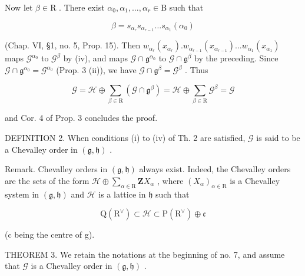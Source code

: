\begin{enumerate}
\end{enumerate}

Now let \(\beta \in \mathrm{R}\) . There exist \(\alpha_0, \alpha_1, \ldots, \alpha_r \in \mathrm{B}\) such that

\[
\beta = s _ {\alpha_ {r}} s _ {\alpha_ {r - 1}} \dots s _ {\alpha_ {1}} (\alpha_ {0})
\]

(Chap. VI, §1, no. 5, Prop. 15). Then \(w_{\alpha_r}(x_{\alpha_r}).w_{\alpha_{r-1}}(x_{\alpha_{r-1}}) \ldots w_{\alpha_1}(x_{\alpha_1})\) maps \(\mathcal{G}^{\alpha_0}\) to \(\mathcal{G}^\beta\) by (iv), and maps \(\mathcal{G} \cap \mathfrak{g}^{\alpha_0}\) to \(\mathcal{G} \cap \mathfrak{g}^\beta\) by the preceding. Since \(\mathcal{G} \cap \mathfrak{g}^{\alpha_0} = \mathcal{G}^{\alpha_0}\) (Prop. 3 (ii)), we have \(\mathcal{G} \cap \mathfrak{g}^\beta = \mathcal{G}^\beta\) . Thus

\[
\mathcal {G} = \mathcal {H} \oplus \sum_ {\beta \in \mathrm{R}} (\mathcal {G} \cap \mathfrak {g} ^ {\beta}) = \mathcal {H} \oplus \sum_ {\beta \in \mathrm{R}} \mathcal {G} ^ {\beta} = \mathcal {G}
\]

and Cor. 4 of Prop. 3 concludes the proof.

DEFINITION 2. When conditions (i) to (iv) of Th. 2 are satisfied, \(\mathcal{G}\) is said to be a Chevalley order in \((\mathfrak{g}, \mathfrak{h})\) .

Remark. Chevalley orders in \((\mathfrak{g},\mathfrak{h})\) always exist. Indeed, the Chevalley orders are the sets of the form \(\mathcal{H}\oplus\sum_{\alpha\in \mathrm{R}}\mathbf{Z}X_{\alpha}\) , where \((X_{\alpha})_{\alpha\in \mathrm{R}}\) is a Chevalley system in \((\mathfrak{g},\mathfrak{h})\) and \(\mathcal{H}\) is a lattice in \(\mathfrak{h}\) such that

\[
\mathrm{Q} (\mathrm{R} ^ {\vee}) \subset \mathcal {H} \subset \mathrm{P} (\mathrm{R} ^ {\vee}) \oplus \mathfrak {c}
\]

(c being the centre of g).

THEOREM 3. We retain the notations at the beginning of no. 7, and assume that \(\mathcal{G}\) is a Chevalley order in \((\mathfrak{g},\mathfrak{h})\) .

